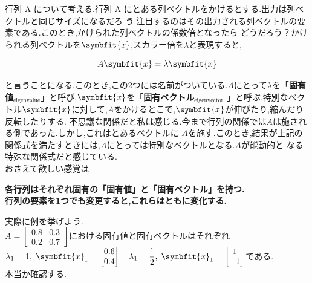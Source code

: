 行列 A について考える.行列 A にとある列ベクトルをかけるとする.出力は列ベクトルと同じサイズになるだろ
う.注目するのはその出力される列ベクトルの要素である.このとき,かけられた列ベクトルの係数倍となったら
どうだろう？かけられる列ベクトルを$\symbfit{x}$,スカラー倍を$\lambda$と表現すると,
\begin{framed}
    \[A\symbfit{x}=\lambda\symbfit{x}\]
\end{framed}
と言うことになる.このとき,この2つには名前がついている.$A$にとって$\lambda$を「\textbf{固有値}$_{\text{eigenvalue}}$」と呼び,$\symbfit{x}$を「\textbf{固有ベクトル}$_{\text{eigenvector}}$
」と呼ぶ.特別なベクトル$\symbfit{x}$に対して,$A$をかけるとこで,$\symbfit{x}$が伸びたり,縮んだり反転したりする.
不思議な関係だと私は感じる.今まで行列の関係では$A$は施される側であった.しかし,これはとあるベクトルに
$A$を施す.このとき,結果が上記の関係式を満たすときには,$A$にとっては特別なベクトルとなる.$A$が能動的と
なる特殊な関係式だと感じている.\\
おさえて欲しい感覚は
\begin{center}
    \textbf{各行列はそれぞれ固有の「固有値」と「固有ベクトル」を持つ.\\行列の要素を1つでも変更すると,これらはともに変化する.}
\end{center}
実際に例を挙げよう. \vspace{2mm}\\
$A=\begin{bmatrix}0.8 & 0.3 \\ 0.2 & 0.7\end{bmatrix}$における固有値と固有ベクトルはそれぞれ$\displaystyle \lambda_1=1,\;\symbfit{x}_1=\begin{bmatrix}0.6\\0.4\end{bmatrix}\quad\lambda_1=\frac{1}{2},\;\symbfit{x}_1=\begin{bmatrix}1\\-1\end{bmatrix}$である.\\[6pt]
本当か確認する.
